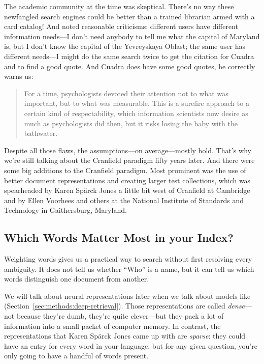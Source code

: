 The academic community at the time was skeptical.  There’s no way
these newfangled search engines could be better than a trained
librarian armed with a card catalog!
And \citet{cuadra-68} noted reasonable criticisms: different users have
different information needs---I don't need anybody to tell me what the
capital of Maryland is, but I don't know the capital of the
Yevreyskaya Oblast; the same user has different needs---I might do the
same search twice to get the citation for Cuadra and to find a good
quote.
%
And Cuadra does have some good quotes, he correctly warns us:
\begin{quote}
  For a time, psychologists devoted their attention
not to what was important, but to what was measurable. This is a surefire
approach to a certain kind of respectability, which information
scientists now desire as much as psychologists did then, but it risks
losing the baby with the bathwater.
\end{quote}

Despite all those flaws, the assumptions---on average---mostly hold.
%
That’s why we’re still talking about the Cranfield paradigm fifty
years later.
%
And there were some big additions to the Cranfield
paradigm.
%
Most prominent was the use of better document representations and
creating larger test collections, which was spearheaded by Karen
Sp\"arck Jones a little bit west of Cranfield at Cambridge and by Ellen
Voorhees and others at the National Institute of Standards and
Technology in Gaithersburg, Maryland.

\subsection{Which Words Matter Most in your Index?}
\label{sec:ir:tf-idf}

Weighting words gives us a practical way to search without first
resolving every ambiguity.  It does not tell us whether ``Who'' is a name,
but it can tell us which words distinguish one document from another.

We will talk about neural representations later when we talk about
models like  (Section~\ref{sec:methods:deep-retrieval}).
%
Those representations are called \emph{dense}---not because they're
dumb, they're quite clever---but they pack a lot of information into
a small packet of computer memory.
%
In contrast, the representations that Karen Sp\"arck Jones came up with
are \emph{sparse}: they could have an entry for every word in your
language, but for any given question, you're only going to have a
handful of words present.

